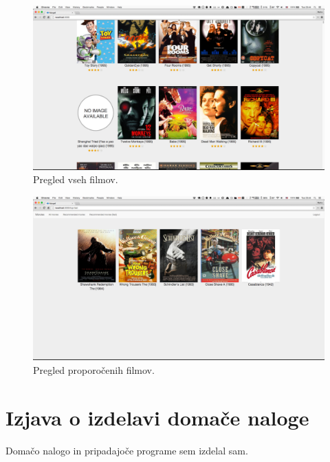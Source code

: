 \documentclass[a4paper,11pt]{article}
\begin{document}
\begin{figure}[htbp]
\begin{center}
  \includegraphics[width=\textwidth,height=\textheight,keepaspectratio]{filmi-vsi.png}
\caption{Pregled vseh filmov.}
\label{slika1}
\end{center}
\end{figure}

\begin{figure}[htbp]
\begin{center}
  \includegraphics[width=\textwidth,height=\textheight,keepaspectratio]{filmi-top.png}
\caption{Pregled proporočenih filmov.}
\label{slika2}
\end{center}
\end{figure}


\section{Izjava o izdelavi domače naloge}
Domačo nalogo in pripadajoče programe sem izdelal sam.
\end{document}
